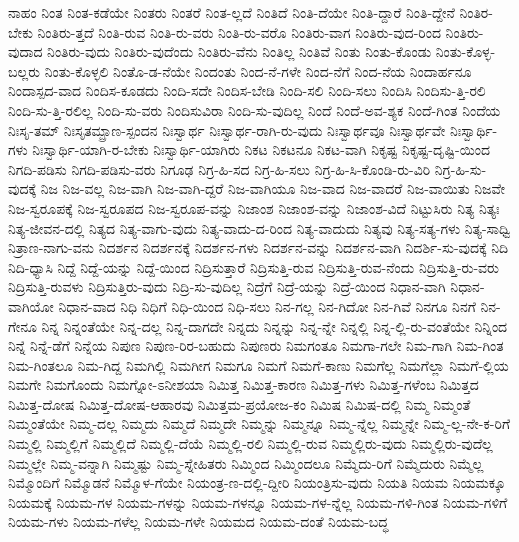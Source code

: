 {ನಾಹಂ
ನಿಂತ
ನಿಂತ-ಕಡೆಯೇ
ನಿಂತರು
ನಿಂತರೆ
ನಿಂತ-ಲ್ಲದೆ
ನಿಂತಿದೆ
ನಿಂತಿ-ದೆಯೇ
ನಿಂತಿ-ದ್ದಾರೆ
ನಿಂತಿ-ದ್ದೇನೆ
ನಿಂತಿರ-ಬೇಕು
ನಿಂತಿರು-ತ್ತದೆ
ನಿಂತಿ-ರುವ
ನಿಂತಿ-ರು-ವರು
ನಿಂತಿ-ರು-ವರೊ
ನಿಂತಿರು-ವಾಗ
ನಿಂತಿರು-ವುದ-ರಿಂದ
ನಿಂತಿರು-ವುದಾದ
ನಿಂತಿರು-ವುದು
ನಿಂತಿರು-ವುದೆಂದು
ನಿಂತಿರು-ವೆನು
ನಿಂತಿಲ್ಲ
ನಿಂತಿವೆ
ನಿಂತು
ನಿಂತು-ಕೊಂಡು
ನಿಂತು-ಕೊಳ್ಳ-ಬಲ್ಲರು
ನಿಂತು-ಕೊಳ್ಳಲಿ
ನಿಂತೊ-ಡ-ನೆಯೇ
ನಿಂದಂತು
ನಿಂದ-ನೆ-ಗಳೇ
ನಿಂದ-ನೆಗೆ
ನಿಂದ-ನೆಯ
ನಿಂದಾರ್ಹನೂ
ನಿಂದಾಸ್ಪದ-ವಾದ
ನಿಂದಿಸ-ಕೂಡದು
ನಿಂದಿ-ಸದೇ
ನಿಂದಿಸ-ಬೇಡಿ
ನಿಂದಿ-ಸಲಿ
ನಿಂದಿ-ಸಲು
ನಿಂದಿಸಿ
ನಿಂದಿಸು-ತ್ತಿ-ರಲಿ
ನಿಂದಿ-ಸು-ತ್ತಿ-ರಲಿಲ್ಲ
ನಿಂದಿ-ಸು-ವರು
ನಿಂದಿಸುವಿರಾ
ನಿಂದಿ-ಸು-ವುದಿಲ್ಲ
ನಿಂದೆ
ನಿಂದೆ-ಅವ-ಶ್ಯಕ
ನಿಂದೆ-ಗಿಂತ
ನಿಂದೆಯ
ನಿಃಸೃ-ತಮ್
ನಿಃಸೃತಮ್ಪ್ರಾಣ-ಸ್ಪಂದನ
ನಿಃಸ್ವಾರ್ಥ
ನಿಃಸ್ವಾರ್ಥ-ರಾಗಿ-ರು-ವುದು
ನಿಃಸ್ವಾರ್ಥವೂ
ನಿಃಸ್ವಾರ್ಥವೇ
ನಿಃಸ್ವಾರ್ಥಿ-ಗಳು
ನಿಃಸ್ವಾರ್ಥಿ-ಯಾಗಿ-ರ-ಬೇಕು
ನಿಃಸ್ವಾರ್ಥಿ-ಯಾಗಿರು
ನಿಕಟ
ನಿಕಟನೂ
ನಿಕಟ-ವಾಗಿ
ನಿಕೃಷ್ಟ
ನಿಕೃಷ್ಟ-ದೃಷ್ಟಿ-ಯಿಂದ
ನಿಗದಿ-ಪಡಿಸು
ನಿಗದಿ-ಪಡಿಸು-ವರು
ನಿಗೂಢ
ನಿಗ್ರ-ಹಿ-ಸದ
ನಿಗ್ರ-ಹಿ-ಸಲು
ನಿಗ್ರ-ಹಿ-ಸಿ-ಕೊಂಡಿ-ರು-ವಿರಿ
ನಿಗ್ರ-ಹಿ-ಸು-ವುದಕ್ಕೆ
ನಿಜ
ನಿಜ-ವಲ್ಲ
ನಿಜ-ವಾಗಿ
ನಿಜ-ವಾಗಿ-ದ್ದರೆ
ನಿಜ-ವಾಗಿಯೂ
ನಿಜ-ವಾದ
ನಿಜ-ವಾದರೆ
ನಿಜ-ವಾಯಿತು
ನಿಜವೇ
ನಿಜ-ಸ್ವರೂಪಕ್ಕೆ
ನಿಜ-ಸ್ವರೂಪದ
ನಿಜ-ಸ್ವರೂಪ-ವನ್ನು
ನಿಜಾಂಶ
ನಿಜಾಂಶ-ವನ್ನು
ನಿಜಾಂಶ-ವಿದೆ
ನಿಟ್ಟುಸಿರು
ನಿತ್ಯ
ನಿತ್ಯಃ
ನಿತ್ಯ-ಜೀವನ-ದಲ್ಲಿ
ನಿತ್ಯದ
ನಿತ್ಯ-ವಾಗು-ವುದು
ನಿತ್ಯ-ವಾದು-ದ-ರಿಂದ
ನಿತ್ಯ-ವಾದುದು
ನಿತ್ಯವು
ನಿತ್ಯ-ಸತ್ಯ-ಗಳು
ನಿತ್ಯ-ಸಾಧ್ವಿ
ನಿತ್ರಾಣ-ನಾಗು-ವನು
ನಿದರ್ಶನ
ನಿದರ್ಶನಕ್ಕೆ
ನಿದರ್ಶನ-ಗಳು
ನಿದರ್ಶನ-ವನ್ನು
ನಿದರ್ಶನ-ವಾಗಿ
ನಿದರ್ಶಿ-ಸು-ವುದಕ್ಕೆ
ನಿದಿ
ನಿದಿ-ಧ್ಯಾಸಿ
ನಿದ್ದೆ
ನಿದ್ದೆ-ಯನ್ನು
ನಿದ್ದೆ-ಯಿಂದ
ನಿದ್ರಿಸುತ್ತಾರೆ
ನಿದ್ರಿಸುತ್ತಿ-ರುವ
ನಿದ್ರಿಸುತ್ತಿ-ರುವ-ನೆಂದು
ನಿದ್ರಿಸುತ್ತಿ-ರು-ವರು
ನಿದ್ರಿಸುತ್ತಿ-ರುವಳು
ನಿದ್ರಿಸುತ್ತಿರು-ವುದು
ನಿದ್ರಿ-ಸು-ವುದಿಲ್ಲ
ನಿದ್ರೆಗೆ
ನಿದ್ರೆ-ಯನ್ನು
ನಿದ್ರೆ-ಯಿಂದ
ನಿಧಾನ-ವಾಗಿ
ನಿಧಾನ-ವಾಗಿಯೋ
ನಿಧಾನ-ವಾದ
ನಿಧಿ
ನಿಧಿಗೆ
ನಿಧಿ-ಯಿಂದ
ನಿಧಿ-ಸಲು
ನಿನ-ಗಲ್ಲ
ನಿನ-ಗಿದೋ
ನಿನ-ಗಿವೆ
ನಿನಗೂ
ನಿನಗೆ
ನಿನ-ಗೇನೂ
ನಿನ್ನ
ನಿನ್ನಂತೆಯೇ
ನಿನ್ನ-ದಲ್ಲ
ನಿನ್ನ-ದಾಗದೇ
ನಿನ್ನದು
ನಿನ್ನನ್ನು
ನಿನ್ನ-ನ್ನೇ
ನಿನ್ನಲ್ಲಿ
ನಿನ್ನ-ಲ್ಲಿ-ರು-ವಂತೆಯೇ
ನಿನ್ನಿಂದ
ನಿನ್ನೆ
ನಿನ್ನೆ-ಡೆಗೆ
ನಿನ್ನೆಯ
ನಿಪುಣ
ನಿಪುಣ-ರಿರ-ಬಹುದು
ನಿಪುಣರು
ನಿಮಗಂತೂ
ನಿಮಗಾ-ಗಲೇ
ನಿಮ-ಗಾಗಿ
ನಿಮ-ಗಿಂತ
ನಿಮ-ಗಿಂತಲೂ
ನಿಮ-ಗಿದ್ದ
ನಿಮಗಿಲ್ಲಿ
ನಿಮಗೀಗ
ನಿಮಗೂ
ನಿಮಗೆ
ನಿಮಗೆ-ಕಾಣು
ನಿಮಗೆಲ್ಲ
ನಿಮಗೆಲ್ಲಾ
ನಿಮಗೆ-ಲ್ಲಿಯ
ನಿಮಗೇ
ನಿಮಗೊಂದು
ನಿಮಗ್ನೋ-ಽನೀಶಯಾ
ನಿಮಿತ್ತ
ನಿಮಿತ್ತ-ಕಾರಣ
ನಿಮಿತ್ತ-ಗಳು
ನಿಮಿತ್ತ-ಗಳೆಂಬ
ನಿಮಿತ್ತದ
ನಿಮಿತ್ತ-ದೋಷ
ನಿಮಿತ್ತ-ದೋಷ-ಆಹಾರವು
ನಿಮಿತ್ತಮ-ಪ್ರಯೋಜ-ಕಂ
ನಿಮಿಷ
ನಿಮಿಷ-ದಲ್ಲಿ
ನಿಮ್ಮ
ನಿಮ್ಮಂತೆ
ನಿಮ್ಮಂತೆಯೇ
ನಿಮ್ಮ-ದಲ್ಲ
ನಿಮ್ಮದು
ನಿಮ್ಮದೆ
ನಿಮ್ಮದೇ
ನಿಮ್ಮನ್ನು
ನಿಮ್ಮನ್ನೂ
ನಿಮ್ಮ-ನ್ನೆಲ್ಲ
ನಿಮ್ಮನ್ನೇ
ನಿಮ್ಮ-ಲ್ಲ-ನೇ-ಕ-ರಿಗೆ
ನಿಮ್ಮಲ್ಲಿ
ನಿಮ್ಮಲ್ಲಿಗೆ
ನಿಮ್ಮಲ್ಲಿದೆ
ನಿಮ್ಮಲ್ಲಿ-ದೆಯೆ
ನಿಮ್ಮಲ್ಲಿ-ರಲಿ
ನಿಮ್ಮಲ್ಲಿ-ರುವ
ನಿಮ್ಮಲ್ಲಿರು-ವುದು
ನಿಮ್ಮಲ್ಲಿರು-ವುದೆಲ್ಲ
ನಿಮ್ಮಲ್ಲೇ
ನಿಮ್ಮ-ವನ್ನಾಗಿ
ನಿಮ್ಮಷ್ಟು
ನಿಮ್ಮ-ಸ್ನೇಹಿತರು
ನಿಮ್ಮಿಂದ
ನಿಮ್ಮಿಂದಲೂ
ನಿಮ್ಮೆದು-ರಿಗೆ
ನಿಮ್ಮೆದುರು
ನಿಮ್ಮೆಲ್ಲ
ನಿಮ್ಮೊಂದಿಗೆ
ನಿಮ್ಮೊಡನೆ
ನಿಮ್ಮೊಳ-ಗೆಯೇ
ನಿಯಂತ್ರ-ಣ-ದಲ್ಲಿ-ದ್ದೀರಿ
ನಿಯಂತ್ರಿಸು-ವುದು
ನಿಯತಿ
ನಿಯಮ
ನಿಯಮಕ್ಕೂ
ನಿಯಮಕ್ಕೆ
ನಿಯಮ-ಗಳ
ನಿಯಮ-ಗಳನ್ನು
ನಿಯಮ-ಗಳನ್ನೂ
ನಿಯಮ-ಗಳ-ನ್ನೆಲ್ಲ
ನಿಯಮ-ಗಳಿ-ಗಿಂತ
ನಿಯಮ-ಗಳಿಗೆ
ನಿಯಮ-ಗಳು
ನಿಯಮ-ಗಳೆಲ್ಲ
ನಿಯಮ-ಗಳೇ
ನಿಯಮದ
ನಿಯಮ-ದಂತೆ
ನಿಯಮ-ಬದ್ಧ
}

